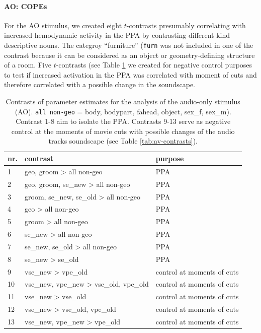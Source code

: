\documentclass[english]{article}
\begin{document}
\paragraph{AO: COPEs}



For the AO stimulus, we created eight $t$-contrasts presumably correlating with
increased hemodynamic activity in the PPA by contrasting different kind
descriptive nouns.
The categroy ``furniture'' (\texttt{furn} was not included in one of the
contrast because it can be considered as an object or geometry-defining
structure of a room.
Five $t$-contrasts (see Table \ref{tab:ao-contrasts} we created for negative
control purposes to test if increased activation in the PPA was correlated with
moment of cuts and therefore correlated with a possible change in the
soundscape.


\begin{table}[t]
    \caption{Contrasts of parameter estimates for the analysis of
        the audio-only stimulus (AO).
\texttt{all non-geo} = body, bodypart, fahead, object, sex\_f, sex\_m).
Contrast 1-8 aim to isolate the PPA.
Contrasts 9-13 serve as negative control at the moments of movie cuts
with possible changes of the audio tracks soundscape (see Table
\ref{tab:av-contrasts}).}

\label{tab:ao-contrasts}
\footnotesize
\begin{tabular}{lll}
\toprule
\textbf{nr.} &  \textbf{contrast} & \textbf{purpose} \\
\midrule
1 & geo, groom > all non-geo & PPA \tabularnewline
2 & geo, groom, se\_new > all non-geo & PPA \tabularnewline
3 & groom, se\_new, se\_old > all non-geo & PPA \tabularnewline
4 & geo > all non-geo & PPA \tabularnewline
5 & groom > all non-geo & PPA \tabularnewline
6 & se\_new > all non-geo & PPA \tabularnewline
7 & se\_new, se\_old > all non-geo & PPA \tabularnewline
8 & se\_new > se\_old & PPA \tabularnewline
9 & vse\_new > vpe\_old & control at moments of cuts \tabularnewline
10 & vse\_new, vpe\_new > vse\_old, vpe\_old & control at moments of cuts \tabularnewline
11 & vse\_new > vse\_old & control at moments of cuts \tabularnewline
12 & vse\_new > vse\_old, vpe\_old & control at moments of cuts \tabularnewline
13 & vse\_new, vpe\_new > vpe\_old & control at moments of cuts \tabularnewline
\end{tabular}
\end{table}
\end{document}

